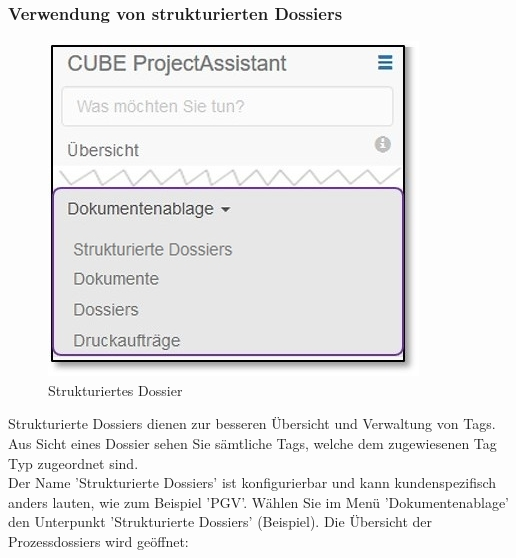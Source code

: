 \subsubsection{Verwendung von strukturierten Dossiers}
\label{bkm:Ref2018073102}

\begin{figure}
  \vspace{-20pt}
  \begin{center}
    \includegraphics[width=1\linewidth]{../chapters/11_Dokumentenablage/pictures/11_Menu_Dokumentenablage_s.jpg}
  \end{center}
  \vspace{-20pt}
  \caption{Strukturiertes Dossier}
  \vspace{-10pt}
\end{figure}

Strukturierte Dossiers dienen zur besseren Übersicht und Verwaltung von Tags. Aus Sicht eines Dossier sehen Sie sämtliche Tags, welche dem zugewiesenen Tag Typ zugeordnet sind.\\

Der Name 'Strukturierte Dossiers' ist konfigurierbar und kann kundenspezifisch anders lauten, wie zum Beispiel 'PGV'. Wählen Sie im Menü 'Dokumentenablage' den Unterpunkt 'Strukturierte Dossiers' (Beispiel). Die Übersicht der Prozessdossiers wird geöffnet:


